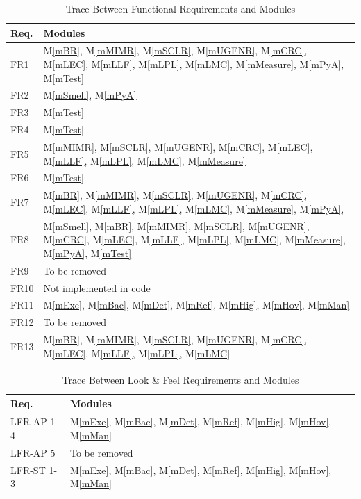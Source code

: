 \documentclass[12pt, titlepage]{article}
\newcommand{\mref}[1]{M\ref{#1}}
\begin{document}
\begin{table}[H]
  \centering
  \begin{tabular}{p{} p{}}
    \toprule
    \textbf{Req.} & \textbf{Modules}\\
    \midrule
    FR1 & \mref{mBR}, \mref{mMIMR}, \mref{mSCLR}, \mref{mUGENR}, \mref{mCRC}, \mref{mLEC}, \mref{mLLF}, \mref{mLPL}, \mref{mLMC}, \mref{mMeasure}, \mref{mPyA}, \mref{mTest}\\
    FR2 & \mref{mSmell}, \mref{mPyA}\\
    FR3 & \mref{mTest}\\
    FR4 & \mref{mTest}\\
    FR5 & \mref{mMIMR}, \mref{mSCLR}, \mref{mUGENR}, \mref{mCRC}, \mref{mLEC}, \mref{mLLF}, \mref{mLPL}, \mref{mLMC}, \mref{mMeasure}\\
    FR6 & \mref{mTest}\\
    FR7 & \mref{mBR}, \mref{mMIMR}, \mref{mSCLR}, \mref{mUGENR}, \mref{mCRC}, \mref{mLEC}, \mref{mLLF}, \mref{mLPL}, \mref{mLMC}, \mref{mMeasure}, \mref{mPyA},\\
    FR8 & \mref{mSmell}, \mref{mBR}, \mref{mMIMR}, \mref{mSCLR}, \mref{mUGENR}, \mref{mCRC}, \mref{mLEC}, \mref{mLLF}, \mref{mLPL}, \mref{mLMC}, \mref{mMeasure}, \mref{mPyA}, \mref{mTest}\\
    FR9 & To be removed\\
    FR10 & Not implemented in code\\
    FR11 & \mref{mExe}, \mref{mBac}, \mref{mDet}, \mref{mRef}, \mref{mHig}, \mref{mHov}, \mref{mMan}\\
    FR12 & To be removed\\
    FR13 & \mref{mBR}, \mref{mMIMR}, \mref{mSCLR}, \mref{mUGENR}, \mref{mCRC}, \mref{mLEC}, \mref{mLLF}, \mref{mLPL}, \mref{mLMC}\\
    \bottomrule
  \end{tabular}
  \caption{Trace Between Functional Requirements and Modules}
  \label{tab:fr-mod}
\end{table}

\begin{table}[H]
  \centering
  \begin{tabular}{p{} p{}}
    \toprule \textbf{Req.} & \textbf{Modules}\\
    \midrule
    LFR-AP 1-4 & \mref{mExe}, \mref{mBac}, \mref{mDet}, \mref{mRef}, \mref{mHig}, \mref{mHov}, \mref{mMan}\\ 
    LFR-AP 5 & To be removed\\ 
    LFR-ST 1-3 & \mref{mExe}, \mref{mBac}, \mref{mDet}, \mref{mRef}, \mref{mHig}, \mref{mHov}, \mref{mMan}\\
    \bottomrule
  \end{tabular}
  \caption{Trace Between Look \& Feel Requirements and Modules}
  \label{tab:LFR-mod}
\end{table}
\end{document}
